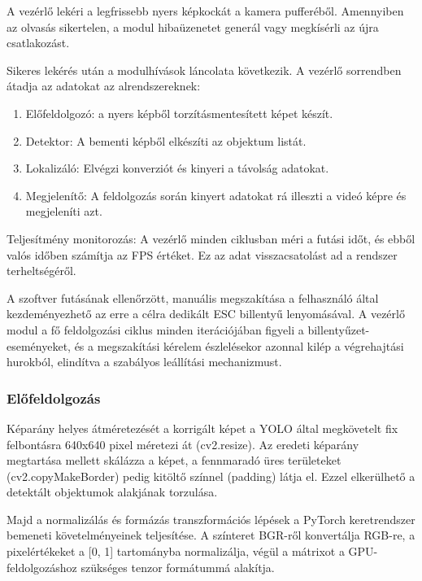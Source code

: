 A vezérlő lekéri a legfrissebb nyers képkockát a kamera pufferéből.
Amennyiben az olvasás sikertelen, a modul hibaüzenetet generál vagy
megkísérli az újra csatlakozást.

Sikeres lekérés után a modulhívások láncolata következik. A vezérlő
sorrendben átadja az adatokat az alrendszereknek:

\begin{enumerate}
\def\labelenumi{\arabic{enumi}.}
\item
  Előfeldolgozó: a nyers képből torzításmentesített képet készít.
\item
  Detektor: A bementi képből elkészíti az objektum listát.
\item
  Lokalizáló: Elvégzi konverziót és kinyeri a távolság adatokat.
\item
  Megjelenítő: A feldolgozás során kinyert adatokat rá illeszti a videó
  képre és megjeleníti azt.
\end{enumerate}

Teljesítmény monitorozás: A vezérlő minden ciklusban méri a futási időt,
és ebből valós időben számítja az FPS értéket. Ez az adat
visszacsatolást ad a rendszer terheltségéről.

A szoftver futásának ellenőrzött, manuális megszakítása a felhasználó
által kezdeményezhető az erre a célra dedikált ESC billentyű
lenyomásával. A vezérlő modul a fő feldolgozási ciklus minden
iterációjában figyeli a billentyűzet-eseményeket, és a megszakítási
kérelem észlelésekor azonnal kilép a végrehajtási hurokból, elindítva a
szabályos leállítási mechanizmust.

\subsubsection{Előfeldolgozás}

Képarány helyes átméretezését a korrigált képet a YOLO által megkövetelt fix felbontásra
640x640 pixel méretezi át (cv2.resize). Az eredeti képarány megtartása
mellett skálázza a képet, a fennmaradó üres területeket
(cv2.copyMakeBorder) pedig kitöltő színnel (padding) látja el. Ezzel
elkerülhető a detektált objektumok alakjának torzulása.

Majd a normalizálás és formázás transzformációs lépések a PyTorch keretrendszer bemeneti
követelményeinek teljesítése. A színteret BGR-ről konvertálja RGB-re, a
pixelértékeket a {[}0, 1{]} tartományba normalizálja, végül a mátrixot a
GPU-feldolgozáshoz szükséges tenzor formátummá alakítja.

